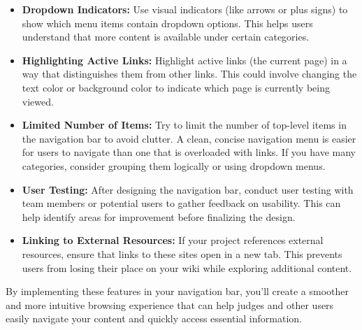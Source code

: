 \begin{itemize}
    \item \textbf{Dropdown Indicators:}
    Use visual indicators (like arrows or plus signs) to show which menu items contain dropdown options.
    This helps users understand that more content is available under certain categories.

    \item \textbf{Highlighting Active Links:}
    Highlight active links (the current page) in a way that distinguishes them from other links.
    This could involve changing the text color or background color to indicate which page is currently being viewed.

    \item \textbf{Limited Number of Items:}
    Try to limit the number of top-level items in the navigation bar to avoid clutter.
    A clean, concise navigation menu is easier for users to navigate than one that is overloaded with links.
    If you have many categories, consider grouping them logically or using dropdown menus.

    \item \textbf{User Testing:}
    After designing the navigation bar, conduct user testing with team members or potential users to gather feedback on usability.
    This can help identify areas for improvement before finalizing the design.

    \item \textbf{Linking to External Resources:}
    If your project references external resources, ensure that links to these sites open in a new tab.
    This prevents users from losing their place on your wiki while exploring additional content.
\end{itemize}
By implementing these features in your navigation bar, you'll create a smoother and more intuitive browsing experience that can help judges and other users easily navigate your content and quickly access essential information.


